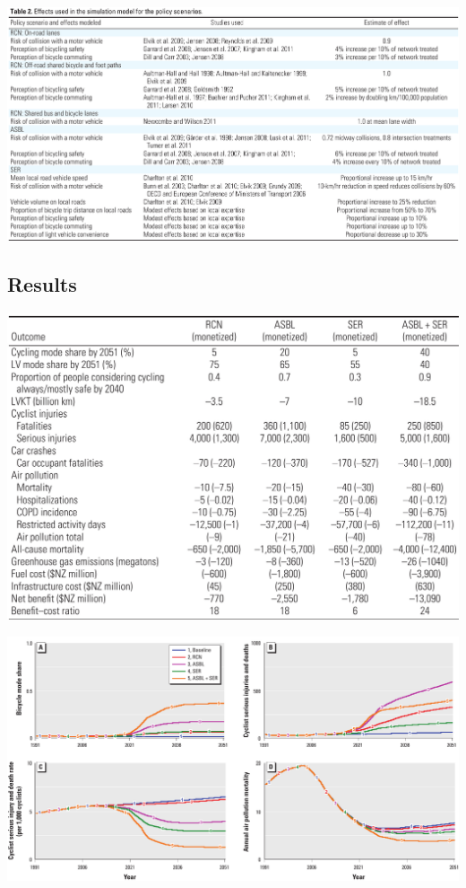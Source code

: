 \documentclass{beamer}
\begin{document}
\begin{frame}
  \includegraphics[width=\textwidth]{Macmillan-table-2.jpg}
\end{frame}

\subsection{Results}

\begin{frame}
  \includegraphics[width=\textwidth]{Macmillan-table-3.jpg}
\end{frame}

\begin{frame}
  \includegraphics[width=\textwidth]{Macmillan-fig-2.jpg}
\end{frame}
\end{document}
